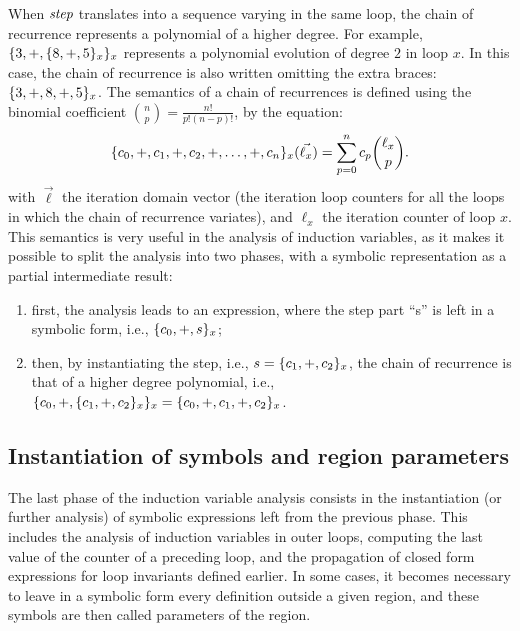 {{When $\textit{step}$ translates into a sequence varying in the same loop, the chain of recurrence represents a polynomial of a higher degree. 
For example, $\{3, +, \{8, +, 5\}_x\}_x$ represents a polynomial evolution of degree $2$ in loop $x$. 
In this case, the chain of recurrence is also written omitting the extra braces: 
$\{3, +, 8, +, 5\}_x$. 
The semantics of a chain of recurrences is defined using the binomial coefficient $\binom{n}{p} = \frac{n!}{p!(n-p)!}$, by the equation:
\begin{equation*}
  \{c_0,+,c_1,+,c_2,+,\ldots,+,c_n\}_x(\vec{\ell_x})=
  \sum_{p=0}^{n}c_{p}\binom{\ell_x}{p}.
\end{equation*}
with $\vec{\ell}$ the iteration domain vector (the iteration loop counters for all the loops in which the chain of recurrence variates), and $\ell_x$ the iteration counter of loop $x$. 
This semantics is very useful in the analysis of induction variables, as it makes it possible to split the analysis into two phases, with a symbolic representation as a partial intermediate result:
\begin{enumerate}
\item first, the analysis leads to an expression, where the step
part ``s'' is left in a symbolic form, i.e., $\{c_0, +, s\}_x$;
\item then, by instantiating the step, i.e., $s = \{c_1, +, c_2\}_x$, the chain of recurrence is that of a higher degree polynomial, i.e., $\{c_0, +, \{c_1, +, c_2\}_x\}_x = \{c_0, +, c_1, +, c_2\}_x$.
\end{enumerate}
}

\subsection{Instantiation of symbols and region parameters}
The last phase of the induction variable analysis consists in the instantiation (or further analysis) of symbolic expressions left from the previous phase. 
This includes the analysis of induction variables in outer loops, computing the last value of the counter of a preceding loop, and the propagation of closed form expressions for loop invariants defined earlier. 
In some cases, it becomes necessary to leave in a symbolic form every definition outside a given region, and these symbols are then called parameters of the region.

}
